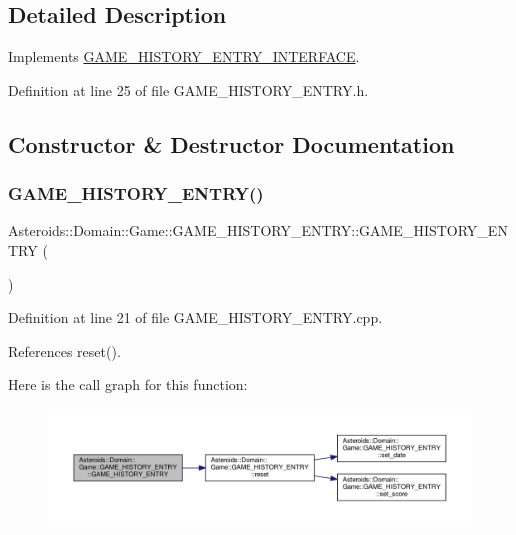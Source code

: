 \subsection{Detailed Description}
Implements \hyperlink{classAsteroids_1_1Domain_1_1Game_1_1GAME__HISTORY__ENTRY__INTERFACE}{G\+A\+M\+E\+\_\+\+H\+I\+S\+T\+O\+R\+Y\+\_\+\+E\+N\+T\+R\+Y\+\_\+\+I\+N\+T\+E\+R\+F\+A\+CE}. 

Definition at line 25 of file G\+A\+M\+E\+\_\+\+H\+I\+S\+T\+O\+R\+Y\+\_\+\+E\+N\+T\+R\+Y.\+h.



\subsection{Constructor \& Destructor Documentation}
\mbox{\label{classAsteroids_1_1Domain_1_1Game_1_1GAME__HISTORY__ENTRY_a2c0700cfa33f03e73a68a72586454aa7}} 
\subsubsection{\texorpdfstring{G\+A\+M\+E\+\_\+\+H\+I\+S\+T\+O\+R\+Y\+\_\+\+E\+N\+T\+R\+Y()}{GAME\_HISTORY\_ENTRY()}}
{\footnotesize\ttfamily Asteroids\+::\+Domain\+::\+Game\+::\+G\+A\+M\+E\+\_\+\+H\+I\+S\+T\+O\+R\+Y\+\_\+\+E\+N\+T\+R\+Y\+::\+G\+A\+M\+E\+\_\+\+H\+I\+S\+T\+O\+R\+Y\+\_\+\+E\+N\+T\+RY (\begin{DoxyParamCaption}{ }\end{DoxyParamCaption})}



Definition at line 21 of file G\+A\+M\+E\+\_\+\+H\+I\+S\+T\+O\+R\+Y\+\_\+\+E\+N\+T\+R\+Y.\+cpp.



References reset().

Here is the call graph for this function\+:\nopagebreak
\begin{figure}[H]
\begin{center}
\leavevmode
\includegraphics[width=350pt]{classAsteroids_1_1Domain_1_1Game_1_1GAME__HISTORY__ENTRY_a2c0700cfa33f03e73a68a72586454aa7_cgraph}
\end{center}
\end{figure}


